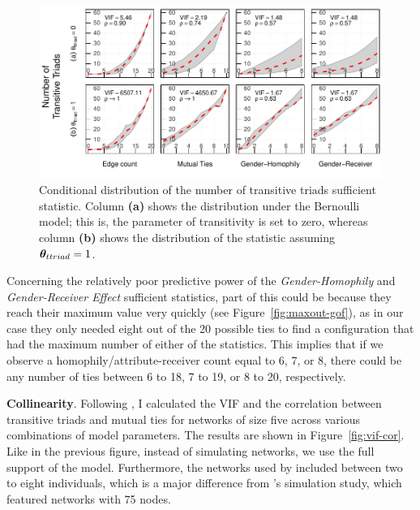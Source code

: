 \documentclass[12pt]{article}
\begin{document}

\begin{figure}[]
    \centering
    \includegraphics[width = .85\linewidth]{figures/conditional-prob-ttriad.pdf}
    \caption[Conditional Distribution of the Transitive Triads Sufficient Statistic]{Conditional distribution of the number of transitive triads sufficient statistic. Column \textbf{(a)} shows the distribution under the Bernoulli model; this is, the parameter of transitivity is set to zero, whereas column \textbf{(b)} shows the distribution of the statistic assuming $\bm{\theta}_{ttriad} = 1$.}
    \label{fig:condprob-ttriads}
\end{figure}

Concerning the relatively poor predictive power of the \textit{Gender-Homophily} and \textit{Gender-Receiver Effect} sufficient statistics, part of this could be because they reach their maximum value very quickly (see Figure~\ref{fig:maxout-gof}), as in our case they only needed eight out of the 20 possible ties to find a configuration that had the maximum number of either of the statistics. This implies that if we observe a homophily/attribute-receiver count equal to 6, 7, or 8, there could be any number of ties between 6 to 18, 7 to 19, or 8 to 20, respectively.

\noindent \textbf{Collinearity}. Following \cite{duxburyDiagnosingMulticollinearityExponential2021}, I calculated the VIF and the correlation between transitive triads and mutual ties for networks of size five across various combinations of model parameters. The results are shown in Figure~\ref{fig:vif-cor}. Like in the previous figure, instead of simulating networks, we use the full support of the model. Furthermore, the networks used by \citeauthor{krivitskyTaleTwoDatasets2022} included between two to eight individuals, which is a major difference from \citeauthor{duxburyDiagnosingMulticollinearityExponential2021}'s simulation study, which featured networks with 75 nodes.
\end{document}
